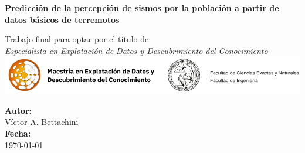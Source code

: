 \documentclass[a4paper]{report}
\begin{document}
%


\begin{titlepage}
    \centering
    
    \huge\textbf{Predicción de la percepción de sismos por la población a partir de datos básicos de terremotos}
    
    \vspace{0.5in}
		Trabajo final para optar por el título de\\
		\emph{Especialista en Explotación de Datos y Descubrimiento del Conocimiento}\\
    \vspace{0.5in}
		\includegraphics[width=\textwidth]{logos}\\
    \vspace{0.5in}
    
    \large
    \textbf{Autor:}\\
		Víctor A. Bettachini\\
    \vspace{0.5in}
    \textbf{Fecha:}\\
    \today
    
    \vfill
    \begin{minipage}{0.8\textwidth}
    \begin{abstract}
        Una decena de terremotos se producen en el territorio nacional en forma diaria sin que sean detectados más que por instrumentos.
				Son muy pocos los casos en que las ondas sísmicas que estos producen son percibidos por la población.
				Se buscó desarrollar un modelo para predecir tal eventualidad utilizando usando solo datos básicos de terremotos.
				Limitaciones de los datos públicos utilizados limitaron el espacio geográficos del estudio a la provincia de San Juan.
				Se ensayaron modelos basado en regresión logística como uno basado en máquinas de potenciación de gradiente.
				Se logró ajustar modelos con alternativamente alta sensibilidad o precisión, pero no ambas simultáneamente, por lo que se debe optar entre estas alternativas según cual sea la prioridad para la aplicación que quiera dárseles.
    \end{abstract}
		\end{minipage}
	\end{titlepage}
\end{document}
